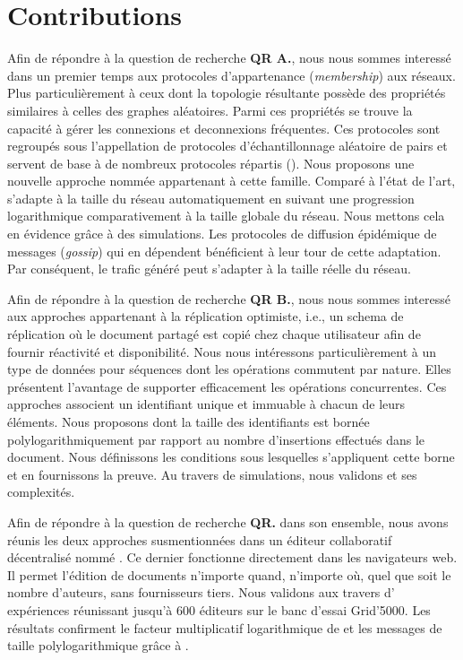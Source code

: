 
\section{Contributions}


Afin de répondre à la question de recherche \textbf{QR A.}, nous nous sommes
interessé dans un premier temps aux protocoles d'appartenance
(\emph{membership}) aux réseaux. Plus particulièrement à ceux dont la topologie
résultante possède des propriétés similaires à celles des graphes
aléatoires. Parmi ces propriétés se trouve la capacité à gérer les connexions et
deconnexions fréquentes. Ces protocoles sont regroupés sous l'appellation de
protocoles d'échantillonnage aléatoire de pairs et servent de base à de nombreux
protocoles répartis (\REF). Nous proposons une nouvelle approche nommée \SPRAY
appartenant à cette famille. Comparé à l'état de l'art, \SPRAY s'adapte à la
taille du réseau automatiquement en suivant une progression logarithmique
comparativement à la taille globale du réseau. Nous mettons cela en évidence
grâce à des simulations.  Les protocoles de diffusion épidémique de messages
(\emph{gossip}) qui en dépendent bénéficient à leur tour de cette
adaptation. Par conséquent, le trafic généré peut s'adapter à la taille réelle
du réseau.

Afin de répondre à la question de recherche \textbf{QR B.}, nous nous sommes
interessé aux approches appartenant à la réplication optimiste, i.e., un schema
de réplication où le document partagé est copié chez chaque utilisateur afin de
fournir réactivité et disponibilité. Nous nous intéressons particulièrement à un
type de données pour séquences dont les opérations commutent par nature. Elles
présentent l'avantage de supporter efficacement les opérations concurrentes. Ces
approches associent un identifiant unique et immuable à chacun de leurs
éléments. Nous proposons \LSEQ dont la taille des identifiants est bornée
polylogarithmiquement par rapport au nombre d'insertions effectués dans le
document. Nous définissons les conditions sous lesquelles s'appliquent cette
borne et en fournissons la preuve. Au travers de simulations, nous validons
\LSEQ et ses complexités.

Afin de répondre à la question de recherche \textbf{QR.} dans son ensemble, nous
avons réunis les deux approches susmentionnées dans un éditeur collaboratif
décentralisé nommé \CRATE. Ce dernier fonctionne directement dans les
navigateurs web. Il permet l'édition de documents n'importe quand, n'importe où,
quel que soit le nombre d'auteurs, sans fournisseurs tiers. Nous validons \CRATE
aux travers d' expériences réunissant jusqu'à 600 éditeurs sur le banc d'essai
Grid'5000. Les résultats confirment le facteur multiplicatif logarithmique de
\SPRAY et les messages de taille polylogarithmique grâce à \LSEQ.



